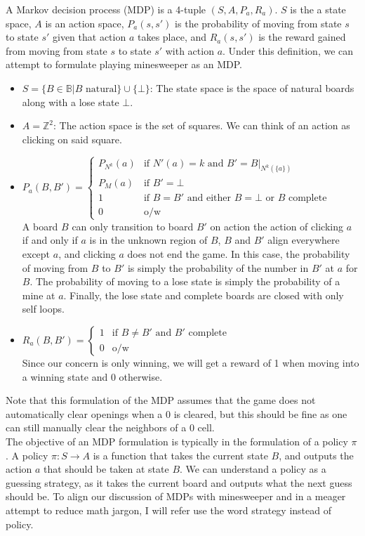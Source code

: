 A Markov decision process (MDP) is a 4-tuple $(S,A,P_a,R_a)$. $S$ is the a state space, $A$ is an action space, $P_a(s,s')$ is the probability of moving from state $s$ to state $s'$ given that action $a$ takes place, and $R_a(s,s')$ is the reward gained from moving from state $s$ to state $s'$ with action $a$. Under this definition, we can attempt to formulate playing minesweeper as an MDP.
\begin{itemize}
    \item $S=\{B\in\mathbb{B}|B\text{ natural}\}\cup\{\bot\}$: The state space is the space of natural boards along with a lose state $\bot$.
    \item $A=\mathbb{Z}^2$: The action space is the set of squares. We can think of an action as clicking on said square.
    \item $P_a(B,B')=\begin{cases}
    P_{N^k}(a) & \text{if $N'(a)=k$ and $B'=B|_{N^k(\{a\})}$}\\
    P_M(a) & \text{if $B'=\bot$}\\
    1 & \text{if $B=B'$ and either $B=\bot$ or $B$ complete}\\
    0 & \text{o/w}
    \end{cases}$\\
    A board $B$ can only transition to board $B'$ on action the action of clicking $a$ if and only if $a$ is in the unknown region of $B$, $B$ and $B'$ align everywhere except $a$, and clicking $a$ does not end the game. In this case, the probability of moving from $B$ to $B'$ is simply the probability of the number in $B'$ at $a$ for $B$. The probability of moving to a lose state is simply the probability of a mine at $a$. Finally, the lose state and complete boards are closed with only self loops.
    \item $R_a(B,B')=\begin{cases}
    1 & \text{if $B\neq B'$ and $B'$ complete}\\
    0 & \text{o/w}
    \end{cases}$\\
    Since our concern is only winning, we will get a reward of 1 when moving into a winning state and 0 otherwise.
\end{itemize}
Note that this formulation of the MDP assumes that the game does not automatically clear openings when a 0 is cleared, but this should be fine as one can still manually clear the neighbors of a 0 cell.\\

The objective of an MDP formulation is typically in the formulation of a policy $\pi$. A policy $\pi:S\to A$ is a function that takes the current state $B$, and outputs the action $a$ that should be taken at state $B$. We can understand a policy as a guessing strategy, as it takes the current board and outputs what the next guess should be. To align our discussion of MDPs with minesweeper and in a meager attempt to reduce math jargon, I will refer use the word strategy instead of policy. 

